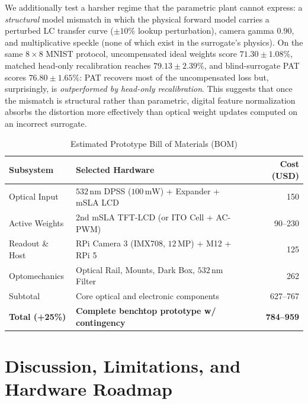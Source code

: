 \documentclass[journal]{IEEEtran}
\begin{document}
We additionally test a harsher regime that the parametric plant cannot express: a \emph{structural} model mismatch in which the physical forward model carries a perturbed LC transfer curve ($\pm 10\%$ lookup perturbation), camera gamma $0.90$, and multiplicative speckle (none of which exist in the surrogate's physics). On the same $8\times 8$ MNIST protocol, uncompensated ideal weights score $71.30 \pm 1.08\%$, matched head-only recalibration reaches $79.13 \pm 2.39\%$, and blind-surrogate PAT scores $76.80 \pm 1.65\%$: PAT recovers most of the uncompensated loss but, surprisingly, is \emph{outperformed by head-only recalibration}. This suggests that once the mismatch is structural rather than parametric, digital feature normalization absorbs the distortion more effectively than optical weight updates computed on an incorrect surrogate.

\begin{table}[!t]
  \centering
  \caption{Estimated Prototype Bill of Materials (BOM)}
  \label{tab:bom}
  \begin{tabular}{@{}llr@{}}
    \toprule
    \textbf{Subsystem} & \textbf{Selected Hardware} & \textbf{Cost (USD)} \\
    \midrule
    Optical Input & $532\,\text{nm}$ DPSS ($100\,\text{mW}$) + Expander + mSLA LCD & 150 \\
    Active Weights & 2nd mSLA TFT-LCD (or ITO Cell + AC-PWM) & 90--230 \\
    Readout \& Host & RPi Camera 3 (IMX708, $12\,\text{MP}$) + M12 + RPi 5 & 125 \\
    Optomechanics & Optical Rail, Mounts, Dark Box, $532\,\text{nm}$ Filter & 262 \\
    \midrule
    Subtotal & Core optical and electronic components & 627--767 \\
    \textbf{Total (+25\%)} & \textbf{Complete benchtop prototype w/ contingency} & \textbf{784--959} \\
    \bottomrule
  \end{tabular}
\end{table}

\section{Discussion, Limitations, and Hardware Roadmap}
\end{document}
